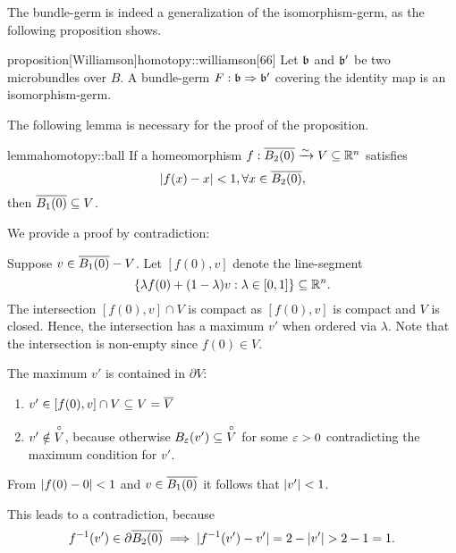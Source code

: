 \begin{myparagraph}
    The bundle-germ is indeed a generalization of the isomorphism-germ,
    as the following proposition shows.
\end{myparagraph}

\begin{mystatement}{proposition}[Williamson]{homotopy::williamson}[66]
    Let $\bb$ and $\bb'$ be two microbundles over $B$.
    A bundle-germ $\germdef{F}{\bb}{\bb'}$ covering
    the identity map is an isomorphism-germ.
\end{mystatement}

\begin{myparagraph}
    The following lemma is necessary for the proof of the proposition.    
\end{myparagraph}

\begin{mystatement}{lemma}{homotopy::ball}
    If a homeomorphism $f: \clball[2] \isomto V \sub \R^n$ satisfies
    \[ \abs{f(x) - x} < 1, \forall x \in \clball[2], \]
    then $\clball[1] \sub V$.
\end{mystatement}

\begin{myproof}
    We provide a proof by contradiction:

    Suppose $v \in \clball[1] - V$.
    Let $[f(0), v]$ denote the line-segment
    \[ \{\lambda f(0) + (1 - \lambda) v:\lambda \in [0, 1]\} \subseteq{} \mathbb{R}^n. \]
    The intersection $[f(0), v] \cap V$ is compact
    as $[f(0), v]$ is compact and $V$ is closed.
    Hence, the intersection has a maximum $v'$ when ordered via $\lambda$.
    Note that the intersection is non-empty since $f(0) \in V$.

    The maximum $v'$ is contained in $\partial V$:
    \begin{enumerate}
        \item $v' \in [f(0), v] \cap V \subseteq{} V = \overline{V}$
        \item $v' \notin \overset{\circ}{V}$, because otherwise
        $\ball[\eps][v'] \sub \inner{V}$ for some $\varepsilon{} > 0$
        contradicting the maximum condition for $v'$.
    \end{enumerate}

    From $\vert{} f(0) - 0 \vert{} < 1$ and $v \in \clball[1]$ it follows that $\vert{} v' \vert{} < 1$. 

    This leads to a contradiction, because
    \[ \inv{f}(v') \in \partial\clball[2] \implies \abs{\inv{f}(v') - v'} = 2 - \abs{v'} > 2 - 1 = 1. \]
\end{myproof}